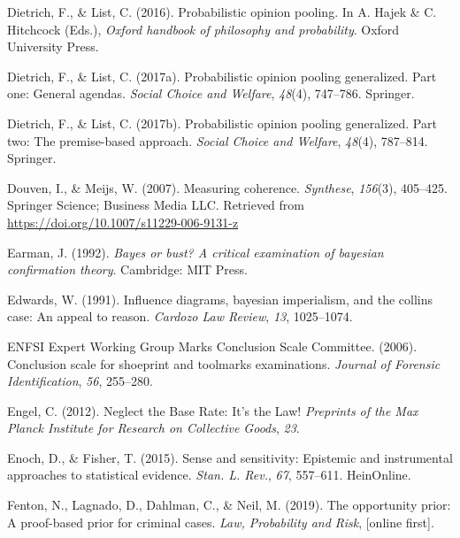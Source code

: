 \documentclass[11pt,dvipsnames,enabledeprecatedfontcommands]{scrartcl}
\begin{document}
\leavevmode\hypertarget{ref-Dietrich2016Probabilistic}{}%
Dietrich, F., \& List, C. (2016). Probabilistic opinion pooling. In A.
Hajek \& C. Hitchcock (Eds.), \emph{Oxford handbook of philosophy and
probability}. Oxford University Press.

\leavevmode\hypertarget{ref-dietrich2017probabilistic1}{}%
Dietrich, F., \& List, C. (2017a). Probabilistic opinion pooling
generalized. Part one: General agendas. \emph{Social Choice and
Welfare}, \emph{48}(4), 747--786. Springer.

\leavevmode\hypertarget{ref-dietrich2017probabilistic2}{}%
Dietrich, F., \& List, C. (2017b). Probabilistic opinion pooling
generalized. Part two: The premise-based approach. \emph{Social Choice
and Welfare}, \emph{48}(4), 787--814. Springer.

\leavevmode\hypertarget{ref-Douven2007measuring}{}%
Douven, I., \& Meijs, W. (2007). Measuring coherence. \emph{Synthese},
\emph{156}(3), 405--425. Springer Science; Business Media LLC. Retrieved
from \url{https://doi.org/10.1007/s11229-006-9131-z}

\leavevmode\hypertarget{ref-earman1992bayes}{}%
Earman, J. (1992). \emph{Bayes or bust? A critical examination of
bayesian confirmation theory}. Cambridge: MIT Press.

\leavevmode\hypertarget{ref-Edwards1991Influence-diagr}{}%
Edwards, W. (1991). Influence diagrams, bayesian imperialism, and the
collins case: An appeal to reason. \emph{Cardozo Law Review}, \emph{13},
1025--1074.

\leavevmode\hypertarget{ref-ENFSI2006entropy}{}%
ENFSI Expert Working Group Marks Conclusion Scale Committee. (2006).
Conclusion scale for shoeprint and toolmarks examinations. \emph{Journal
of Forensic Identification}, \emph{56}, 255--280.

\leavevmode\hypertarget{ref-engel2012NeglectBaseRate}{}%
Engel, C. (2012). Neglect the Base Rate: It's the Law! \emph{Preprints
of the Max Planck Institute for Research on Collective Goods},
\emph{23}.

\leavevmode\hypertarget{ref-enoch2015sense}{}%
Enoch, D., \& Fisher, T. (2015). Sense and sensitivity: Epistemic and
instrumental approaches to statistical evidence. \emph{Stan. L. Rev.},
\emph{67}, 557--611. HeinOnline.

\leavevmode\hypertarget{ref-fenton2019OpportunityPriorProofbased}{}%
Fenton, N., Lagnado, D., Dahlman, C., \& Neil, M. (2019). The
opportunity prior: A proof-based prior for criminal cases. \emph{Law,
Probability and Risk}, {[}online first{]}.
\end{document}
